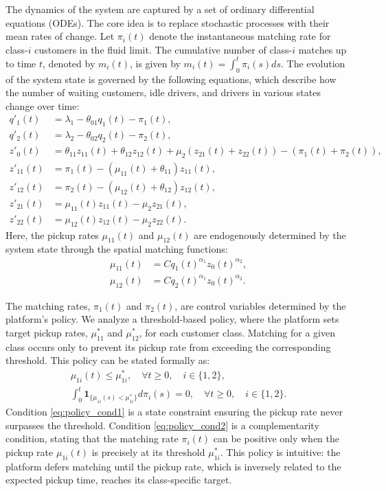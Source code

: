 The dynamics of the system are captured by a set of ordinary differential equations (ODEs).
The core idea is to replace stochastic processes with their mean rates of change.
Let $\pi_i(t)$ denote the instantaneous matching rate for class-$i$ customers in the fluid limit.
The cumulative number of class-$i$ matches up to time $t$, denoted by $m_i(t)$, is given by $m_i(t) = \int_0^t \pi_i(s) ds$.
The evolution of the system state is governed by the following equations, which describe how the number of waiting customers, idle drivers, and drivers in various states change over time:
\begin{align}
q'_1(t) &= \lambda_1 - \theta_{01}q_1(t) - \pi_1(t), \label{eq:fluid_q1}\\
q'_2(t) &= \lambda_2 - \theta_{02}q_2(t) - \pi_2(t), \label{eq:fluid_q2}\\
z'_0(t) &= \theta_{11}z_{11}(t) + \theta_{12}z_{12}(t) + \mu_2(z_{21}(t) + z_{22}(t)) - (\pi_1(t) + \pi_2(t)), \label{eq:fluid_z0}\\
z'_{11}(t) &= \pi_1(t) - (\mu_{11}(t)+\theta_{11})z_{11}(t), \label{eq:fluid_z11}\\
z'_{12}(t) &= \pi_2(t) - (\mu_{12}(t)+\theta_{12})z_{12}(t), \label{eq:fluid_z12}\\
z'_{21}(t) &= \mu_{11}(t)z_{11}(t) - \mu_2 z_{21}(t), \label{eq:fluid_z21}\\
z'_{22}(t) &= \mu_{12}(t)z_{12}(t) - \mu_2 z_{22}(t). \label{eq:fluid_z22}
\end{align}
Here, the pickup rates $\mu_{11}(t)$ and $\mu_{12}(t)$ are endogenously determined by the system state through the spatial matching functions:
\begin{align}
\mu_{11}(t) &= C q_1(t)^{\alpha_1} z_0(t)^{\alpha_2}, \label{eq:fluid_mu11}\\
\mu_{12}(t) &= C q_2(t)^{\alpha_1} z_0(t)^{\alpha_2}. \label{eq:fluid_mu12}
\end{align}

The matching rates, $\pi_1(t)$ and $\pi_2(t)$, are control variables determined by the platform's policy.
We analyze a threshold-based policy, where the platform sets target pickup rates, $\mu_{11}^*$ and $\mu_{12}^*$, for each customer class.
Matching for a given class occurs only to prevent its pickup rate from exceeding the corresponding threshold.
This policy can be stated formally as:
\begin{gather}
\mu_{1i}(t) \leq \mu_{1i}^*, \quad \forall t \ge 0, \quad i \in \{1, 2\}, \label{eq:policy_cond1} \\
\int_0^t \mathbf{1}_{\{\mu_{1i}(s) < \mu_{1i}^*\}} d\pi_i(s) = 0, \quad \forall t \ge 0, \quad i \in \{1, 2\}. \label{eq:policy_cond2}
\end{gather}
Condition \eqref{eq:policy_cond1} is a state constraint ensuring the pickup rate never surpasses the threshold.
Condition \eqref{eq:policy_cond2} is a complementarity condition, stating that the matching rate $\pi_i(t)$ can be positive only when the pickup rate $\mu_{1i}(t)$ is precisely at its threshold $\mu_{1i}^*$.
This policy is intuitive: the platform defers matching until the pickup rate, which is inversely related to the expected pickup time, reaches its class-specific target.

